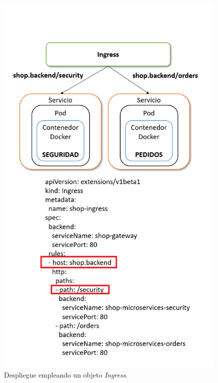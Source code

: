 \documentclass[11pt,spanish,listoffigures]{tfgetsinf}
\begin{document}
\begin{figure}[h]
\centering
\includegraphics[scale=0.7]{Ingress}
\caption{Despliegue empleando un objeto \textit{Ingress}.}
\label{fig:Ingress}
\end{figure}
\end{document}
